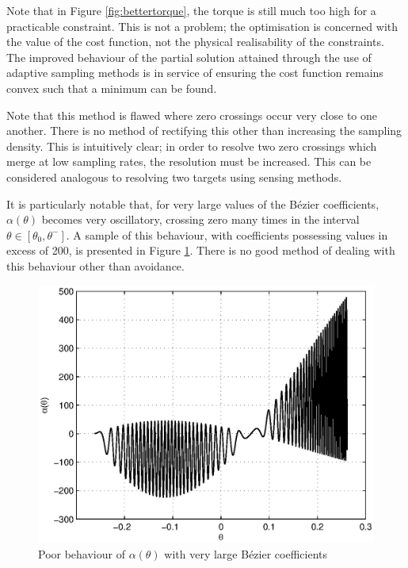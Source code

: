 Note that in Figure \ref{fig:bettertorque}, the torque is still much too high for a practicable constraint. This is not a problem; the optimisation is concerned with the value of the cost function, not the physical realisability of the constraints. The improved behaviour of the partial solution attained through the use of adaptive sampling methods is in service of ensuring the cost function remains convex such that a minimum can be found.

Note that this method is flawed where zero crossings occur very close to one another. There is no method of rectifying this other than increasing the sampling density. This is intuitively clear; in order to resolve two zero crossings which merge at low sampling rates, the resolution must be increased. This can be considered analogous to resolving two targets using sensing methods.

It is particularly notable that, for very large values of the Bézier coefficients, $\alpha(\theta)$ becomes very oscillatory, crossing zero many times in the interval $\theta\in[\theta_0, \theta^-]$. A sample of this behaviour, with coefficients possessing values in excess of 200, is presented in Figure \ref{fig:badalpha}. There is no good method of dealing with this behaviour other than avoidance.
  
\begin{figure}
\centering
\includegraphics[width=0.6\linewidth]{4VirtConstLib/badalpha}
\caption{Poor behaviour of $\alpha(\theta)$ with very large Bézier coefficients}
\label{fig:badalpha}
\end{figure}
